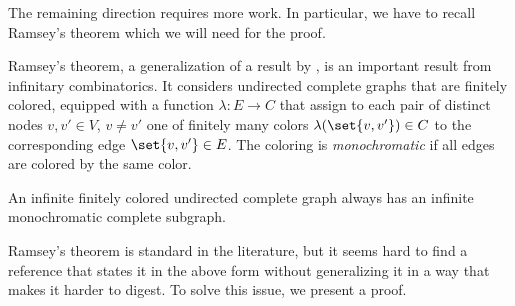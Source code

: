 \documentclass[../../diss.tex]{subfiles}
\begin{document}
The remaining direction requires more work.
In particular, we have to recall Ramsey's theorem which we will need for the proof.

Ramsey's theorem, a generalization of a result by , is an important result from infinitary combinatorics.
It considers undirected complete graphs that are finitely colored, \ie equipped with a function $\lambda \colon E \to C$ that assign to each pair of distinct nodes $v,v' \in V$, $v \neq v'$ one of finitely many colors $\lambda(\set{v,v'}) \in C$ to the corresponding edge $\set{v,v'} \in E$.
The coloring is \emph{monochromatic} if all edges are colored by the same color.

\begin{ntheorem}%
\label{Theorem:Ramsey}%
    An infinite finitely colored undirected complete graph always has an infinite monochromatic complete subgraph.
\end{ntheorem}

Ramsey's theorem is standard in the literature, but it seems hard to find a reference that states it in the above form without generalizing it in a way that makes it harder to digest.
To solve this issue, we present a proof.
\end{document}
